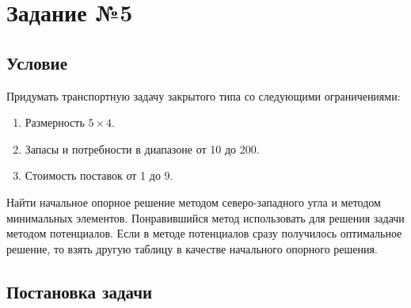 \section{Задание №5}

\subsection{Условие}\label{05-lab-condition}

Придумать транспортную задачу закрытого типа со следующими ограничениями:
\begin{enumerate}
    \item Размерность $5 \times 4$.
    \item Запасы и потребности в диапазоне от 10 до 200.
    \item Стоимость поставок от 1 до 9.
\end{enumerate}

Найти начальное опорное решение методом северо-западного угла и методом минимальных элементов.
Понравившийся метод использовать для решения задачи методом потенциалов.
Если в методе потенциалов сразу получилось оптимальное решение, то взять другую таблицу в качестве начального опорного решения.

\subsection{Постановка задачи}\label{05-lab-statement}

